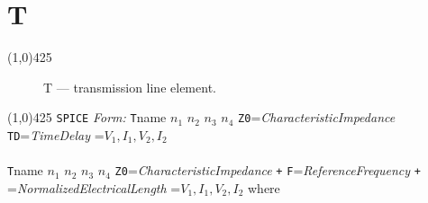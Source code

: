 
\oddsidemargin 10mm \topmargin 0.0in \textwidth 5.5in \textheight 7.375in
\evensidemargin 1.0in \headheight 0.18in \footskip 0.16in
%
\section[T \- Transmission Line]{ \hspace{70mm}\huge \textbf{T}}
\linethickness{1mm}
\line(1,0){425}
\normalsize
\begin{figure}[h]
\centerline{\epsfxsize=1.1in} \caption{T ---
transmission line element.}
\end{figure}
\linethickness{0.5mm}
\line(1,0){425}
\newline
\texttt{SPICE} \textit{Form:}
\newline
{\tt T}name $n_1$ $n_2$ $n_3$ $n_4$
     \E
    {\tt Z0}={\it CharacteristicImpedance}
    {\tt TD}={\it TimeDelay}
    =$V_1,I_1,V_2,I_2$\E  \\
    \\
    {\tt T}name $n_1$ $n_2$ $n_3$ $n_4$  \E
       {\tt Z0}={\it CharacteristicImpedance} \newline
    {\tt +}   {\tt F}={\it ReferenceFrequency}
    {\tt +} ={\it NormalizedElectricalLength}\E
    =$V_1,I_1,V_2,I_2$\E
\newline
where
\newline
